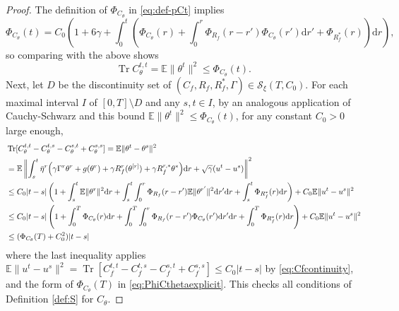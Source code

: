 \documentclass[10pt,a4paper]{amsart}
\def\Cf{C_f}
\def\Ct{C_\theta}
\def\E{\mathbb{E}}
\def\Rf{R_f}
\def\Tr{\operatorname{Tr}}
\def\cS{\mathcal{S}}
\def\d{\mathrm{d}}
\newcommand{\norm}[1]{\|#1\|}
\def\pCt{\Phi_{\Ct}}
\begin{document}
\begin{proof}
The definition of $\pCt$ in \eqref{eq:def-pCt} implies
\begin{equation}\label{eq:PhiCthetaexplicit}
\pCt(t)=C_0\left(1+6\gamma+\int_0^t \left(\pCt(r)
+\int_0^r \Phi_{R_f}(r-r')\pCt(r')\d r'+\Phi_{R_f^*}(r) \right)\d r\right),
\end{equation}
so comparing with the above shows
\[\Tr C_\theta^{t,t}=\E\|\theta^t\|^2 \leq \Phi_{\Ct}(t).\]
Next, let $D$ be the discontinuity set of $(\Cf,\Rf,\Rf^*,\Gamma) \in
\cS_\xi(T,C_0)$.
For each maximal interval $I$ of $[0,T] \setminus D$
and any $s,t\in I$, by an analogous application of Cauchy-Schwarz
and this bound $\E\|\theta^t\|^2 \leq \Phi_{C_\theta}(t)$, for any constant
$C_0>0$ large enough,
\begin{align}
&\Tr[\Ct^{t,t} - \Ct^{t,s} - \Ct^{s,t} + \Ct^{s,s}]
=\E \norm{\theta^t-\theta^s}^2\notag\\
&=\E\left\|\int_s^t \bar\eta^r \Big({\gamma}\Gamma^r
\theta^r+g(\theta^r)+{\gamma}R_f^{r}(\theta^{[r]})+
{\gamma}R_f^{r,*}\theta^*\Big)\d r+\sqrt{\gamma}(u^t-u^s)\right\|^2\notag\\
&\leq C_0|t-s|\left(1+\int_s^t \E\|\theta^r\|^2\d r
+\int_s^t\int_0^r \Phi_{R_f}(r-r')\E\|\theta^{r'}\|^2\d r'\d r
+\int_s^t\Phi_{R_f^*}(r)\d r\right)+C_0\E\|u^t-u^s\|^2\notag\\
&\leq C_0|t-s|\left(1+\int_0^T \Phi_{C_\theta}(r)\d r
+\int_0^T \int_0^r \Phi_{R_f}(r-r')\Phi_{C_\theta}(r')\d r' \d r
+\int_0^T \Phi_{R_f^*}(r)\d r\right)
+C_0\E\|u^t-u^s\|^2\notag\\
&\leq (\Phi_{C_\theta}(T)+C_0^2)|t-s|\label{eq:bound-cont-Ct}
\end{align}
where the last inequality applies
$\E\norm{u^t-u^s}^2=\Tr[\Cf^{t,t}-\Cf^{t,s}-\Cf^{s,t}+\Cf^{s,s}]
\leq C_0|t-s|$ by \eqref{eq:Cfcontinuity}, and the form of
$\Phi_{\Ct}(T)$ in \eqref{eq:PhiCthetaexplicit}.
This checks all conditions of Definition \ref{def:S} for $C_\theta$.


\end{proof}
\end{document}
